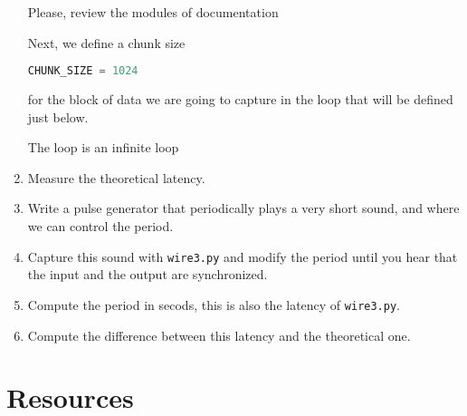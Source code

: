 \begin{enumerate}
Please, review the modules of documentation 

Next, we define a chunk size
\begin{lstlisting}[language=Python]
CHUNK_SIZE = 1024
\end{lstlisting}
for the block of data we are going to capture in the loop that will
be defined just below.

The loop is an infinite loop

\item Measure the theoretical latency.

\item Write a pulse generator that periodically plays a very short
  sound, and where we can control the period.

\item Capture this sound with \texttt{wire3.py} and modify the period
  until you hear that the input and the output are synchronized.

\item Compute the period in secods, this is also the latency of
  \texttt{wire3.py}.

\item Compute the difference between this latency and the theoretical
  one.

\end{enumerate}

\section{Resources}



